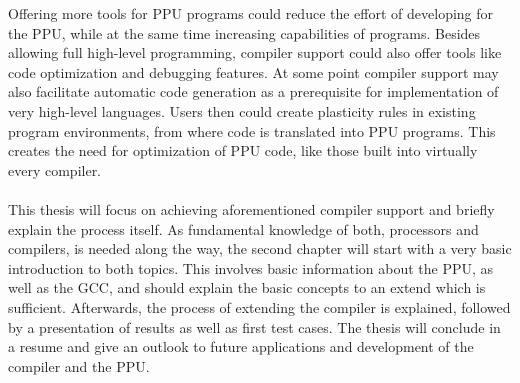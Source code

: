 Offering more tools for \ac{PPU} programs could reduce the effort of developing for the \ac{PPU}, while at the same time increasing capabilities of programs.
Besides allowing full high-level programming, compiler support could also offer tools like code optimization and debugging features.
At some point compiler support may also facilitate automatic code generation as a prerequisite for implementation of very high-level languages.
Users then could create plasticity rules in existing program environments, from where code is translated into \ac{PPU} programs.
This creates the need for optimization of \ac{PPU} code, like those built into virtually every compiler.
\\
\\
This thesis will focus on achieving aforementioned compiler support and briefly explain the process itself.
As fundamental knowledge of both, processors and compilers, is needed along the way, the second chapter will start with a very basic introduction to both topics.
This involves basic information about the \ac{PPU}, as well as the \ac{GCC}, and should explain the basic concepts to an extend which is sufficient.
Afterwards, the process of extending the compiler is explained, followed by a presentation of results as well as first test cases.
The thesis will conclude in a resume and give an outlook to future applications and development of the compiler and the \ac{PPU}.
